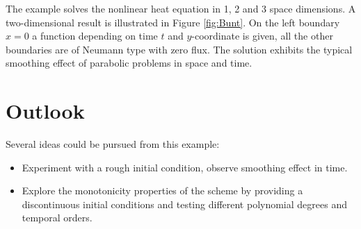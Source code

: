 \documentclass[a4paper,12pt]{article}
\begin{document}
The example solves the nonlinear heat equation in 1, 2 and 3 space dimensions.
A two-dimensional result is illustrated in Figure \ref{fig:Bunt}. On the left boundary
$x=0$ a function depending on time $t$ and $y$-coordinate is given, all the other
boundaries are of Neumann type with zero flux. The solution exhibits the
typical smoothing effect of parabolic problems in space and time.

\section{Outlook}

Several ideas could be pursued from this example:
\begin{itemize}
\item Experiment with a rough initial condition, observe
smoothing effect in time.
\item Explore the monotonicity properties of the scheme by
providing a discontinuous initial conditions and testing different
polynomial degrees and temporal orders.
\end{itemize}



\end{document}
